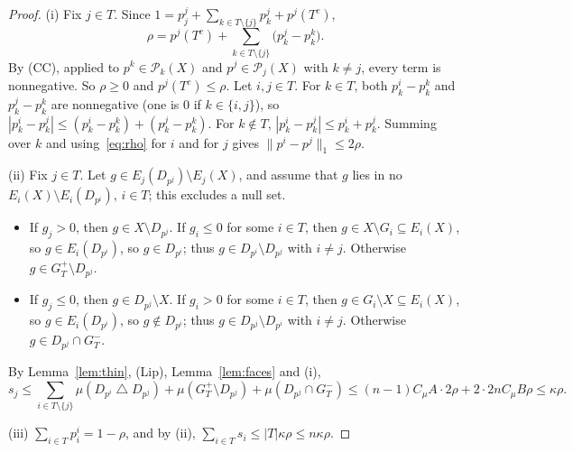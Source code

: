 \documentclass[11pt]{article}
\theoremstyle{definition}
\newcommand{\Pc}{\mathcal P}
\newcommand{\sd}{\mathbin{\triangle}}
\begin{document}
\begin{proof}
(i) Fix $j\in T$. Since $1=p^j_j+\sum_{k\in T\setminus\{j\}}p^j_k+p^j(T^c)$,
\begin{equation}\label{eq:rho}
\rho=p^j(T^c)+\sum_{k\in T\setminus\{j\}}\big(p^j_k-p^k_k\big).
\end{equation}
By (CC), applied to $p^k\in\Pc_k(X)$ and $p^j\in\Pc_j(X)$ with $k\ne j$, every term is nonnegative. So $\rho\ge0$ and $p^j(T^c)\le\rho$. Let $i,j\in T$. For $k\in T$, both $p^i_k-p^k_k$ and $p^j_k-p^k_k$ are nonnegative (one is $0$ if $k\in\{i,j\}$), so $|p^i_k-p^j_k|\le(p^i_k-p^k_k)+(p^j_k-p^k_k)$. For $k\notin T$, $|p^i_k-p^j_k|\le p^i_k+p^j_k$. Summing over $k$ and using~\eqref{eq:rho} for $i$ and for $j$ gives $\|p^i-p^j\|_1\le2\rho$.

(ii) Fix $j\in T$. Let $g\in E_j(D_{p^j})\setminus E_j(X)$, and assume that $g$ lies in no $E_i(X)\setminus E_i(D_{p^i})$, $i\in T$; this excludes a null set.
\begin{itemize}[leftmargin=*]
\item If $g_j>0$, then $g\in X\setminus D_{p^j}$. If $g_i\le0$ for some $i\in T$, then $g\in X\setminus G_i\subseteq E_i(X)$, so $g\in E_i(D_{p^i})$, so $g\in D_{p^i}$; thus $g\in D_{p^i}\setminus D_{p^j}$ with $i\ne j$. Otherwise $g\in G_T^+\setminus D_{p^j}$.
\item If $g_j\le0$, then $g\in D_{p^j}\setminus X$. If $g_i>0$ for some $i\in T$, then $g\in G_i\setminus X\subseteq E_i(X)$, so $g\in E_i(D_{p^i})$, so $g\notin D_{p^i}$; thus $g\in D_{p^j}\setminus D_{p^i}$ with $i\ne j$. Otherwise $g\in D_{p^j}\cap G_T^-$.
\end{itemize}
By Lemma~\ref{lem:thin}, (Lip), Lemma~\ref{lem:faces} and (i),
\[
s_j\le\sum_{i\in T\setminus\{j\}}\mu(D_{p^i}\sd D_{p^j})+\mu(G_T^+\setminus D_{p^j})+\mu(D_{p^j}\cap G_T^-)
\le(n-1)C_\mu A\cdot2\rho+2\cdot2nC_\mu B\rho\le\kappa\rho .
\]

(iii) $\sum_{i\in T}p^i_i=1-\rho$, and by (ii), $\sum_{i\in T}s_i\le|T|\kappa\rho\le n\kappa\rho$.
\end{proof}
\end{document}
